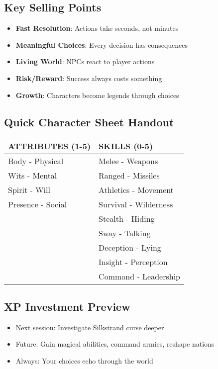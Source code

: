 \documentclass[11pt]{article}
\begin{document}
\subsection*{Key Selling Points}
\begin{itemize}
\item {} \textbf{Fast Resolution}: Actions take seconds, not minutes
\item {} \textbf{Meaningful Choices}: Every decision has consequences
\item {} \textbf{Living World}: NPCs react to player actions
\item {} \textbf{Risk/Reward}: Success always costs something
\item {} \textbf{Growth}: Characters become legends through choices
\end{itemize}

\subsection*{Quick Character Sheet Handout}
\begin{center}
\begin{tabular}{|l|l|}
\hline
\textbf{ATTRIBUTES (1-5)} & \textbf{SKILLS (0-5)} \\
\hline
Body - Physical & Melee - Weapons \\
Wits - Mental & Ranged - Missiles \\
Spirit - Will & Athletics - Movement \\
Presence - Social & Survival - Wilderness \\
& Stealth - Hiding \\
& Sway - Talking \\
& Deception - Lying \\
& Insight - Perception \\
& Command - Leadership \\
\hline
\end{tabular}
\end{center}

\subsection*{XP Investment Preview}
\begin{itemize}
\item Next session: Investigate Silkstrand curse deeper
\item Future: Gain magical abilities, command armies, reshape nations
\item Always: Your choices echo through the world
\end{itemize}
\end{document}
